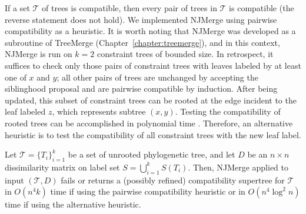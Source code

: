 If a set $\mathcal{T}$ of trees is compatible, then every pair of trees in $\mathcal{T}$ is compatible (the reverse statement does not hold). 
We implemented NJMerge using pairwise compatibility as a heuristic.
It is worth noting that NJMerge was developed as a subroutine of \gls{TreeMerge} (Chapter~\ref{chapter:treemerge}), and in this context, NJMerge is run on $k=2$ constraint trees of bounded size.
In retrospect, it suffices to check only those pairs of constraint trees with leaves labeled by at least one of $x$ and $y$; all other pairs of trees are unchanged by accepting the siblinghood proposal and are pairwise compatible by induction.
After being updated, this subset of constraint trees can be rooted at the edge incident to the leaf labeled $z$, which represents subtree $(x,y)$.
Testing the compatibility of rooted trees can be accomplished in polynomial time \cite{aho1981inferring, deng2018fast}.
Therefore, an alternative heuristic is to test the compatibility of all constraint trees with the new leaf label.

\begin{theorem}
\label{thm:njmerge}
Let $\mathcal{T} = \{T_i \}_{i=1}^k$ be a set of unrooted phylogenetic tree, and let $D$ be an $n \times n$ dissimilarity matrix on label set $S = \bigcup_{i=1}^k S(T_i)$.
Then, NJMerge applied to input $(\mathcal{T}, D)$ fails or returns a (possibly refined) compatibility supertree for $\mathcal{T}$ in $O(n^4k)$ time if using the pairwise compatibility heuristic or in $O(n^4 \log^2{n})$ time if using the alternative heuristic.
\end{theorem}


